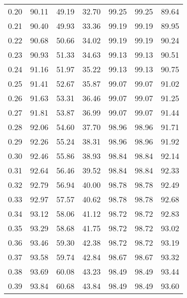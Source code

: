 \begin{tabular}{|c|c|c|c|c|c|c|}
      0.20 &     90.11 &     49.19 &      32.70 &   99.25 &      99.25 &         89.64 \\
      0.21 &     90.40 &     49.93 &      33.36 &   99.19 &      99.19 &         89.95 \\
      0.22 &     90.68 &     50.66 &      34.02 &   99.19 &      99.19 &         90.24 \\
      0.23 &     90.93 &     51.33 &      34.63 &   99.13 &      99.13 &         90.51 \\
      0.24 &     91.16 &     51.97 &      35.22 &   99.13 &      99.13 &         90.75 \\
      0.25 &     91.41 &     52.67 &      35.87 &   99.07 &      99.07 &         91.02 \\
      0.26 &     91.63 &     53.31 &      36.46 &   99.07 &      99.07 &         91.25 \\
      0.27 &     91.81 &     53.87 &      36.99 &   99.07 &      99.07 &         91.44 \\
      0.28 &     92.06 &     54.60 &      37.70 &   98.96 &      98.96 &         91.71 \\
      0.29 &     92.26 &     55.24 &      38.31 &   98.96 &      98.96 &         91.92 \\
      0.30 &     92.46 &     55.86 &      38.93 &   98.84 &      98.84 &         92.14 \\
      0.31 &     92.64 &     56.46 &      39.52 &   98.84 &      98.84 &         92.33 \\
      0.32 &     92.79 &     56.94 &      40.00 &   98.78 &      98.78 &         92.49 \\
      0.33 &     92.97 &     57.57 &      40.62 &   98.78 &      98.78 &         92.68 \\
      0.34 &     93.12 &     58.06 &      41.12 &   98.72 &      98.72 &         92.83 \\
      0.35 &     93.29 &     58.68 &      41.75 &   98.72 &      98.72 &         93.02 \\
      0.36 &     93.46 &     59.30 &      42.38 &   98.72 &      98.72 &         93.19 \\
      0.37 &     93.58 &     59.74 &      42.84 &   98.67 &      98.67 &         93.32 \\
      0.38 &     93.69 &     60.08 &      43.23 &   98.49 &      98.49 &         93.44 \\
      0.39 &     93.84 &     60.68 &      43.84 &   98.49 &      98.49 &         93.60 \\

\end{tabular}
